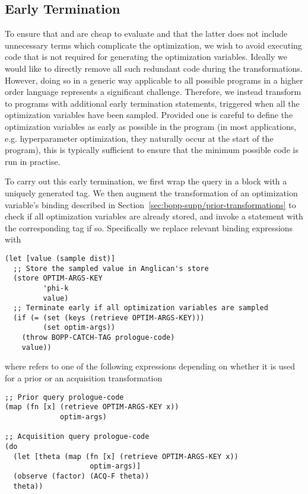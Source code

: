 \subsection{Early Termination}
\label{sec:bopp-supp/early-term}
To ensure that  and  are cheap to evaluate and that the latter does not include unnecessary terms which complicate the optimization, we wish to avoid executing code that is not required for generating the optimization variables.
Ideally we would like to directly remove all such redundant code during the transformations.
However, doing so in a generic way applicable to all possible programs in a higher order language represents a significant challenge.
Therefore, we instead transform to programs with additional early termination statements, triggered when all the optimization variables have been sampled.  
Provided one is careful to define the optimization variables as early as possible in the program (in most applications, e.g. hyperparameter optimization, they naturally occur at the start of the program), this is typically sufficient to ensure that the minimum possible code is run in practise.

To carry out this early termination, we first wrap the query in a  block with a uniquely generated tag.  We then augment the transformation of an optimization variable's binding described in Section~\ref{sec:bopp-supp/prior-transformations} to check if all optimization variables are already stored, and invoke a  statement with the corresponding tag if so.  Specifically we replace relevant binding expressions  with
    \begin{lstlisting}[basicstyle=\footnotesize\ttfamily]
(let [value (sample dist)]
  ;; Store the sampled value in Anglican's store
  (store OPTIM-ARGS-KEY
         'phi-k
         value)
  ;; Terminate early if all optimization variables are sampled
  (if (= (set (keys (retrieve OPTIM-ARGS-KEY)))
         (set optim-args))
    (throw BOPP-CATCH-TAG prologue-code)
    value))
    \end{lstlisting}
where  refers to one of the following expressions depending on whether it is used for a prior or an acquisition transformation
    \begin{lstlisting}[basicstyle=\footnotesize\ttfamily]
;; Prior query prologue-code
(map (fn [x] (retrieve OPTIM-ARGS-KEY x))
             optim-args)

;; Acquisition query prologue-code
(do
  (let [theta (map (fn [x] (retrieve OPTIM-ARGS-KEY x))
                    optim-args)]
  (observe (factor) (ACQ-F theta))
  theta))
    \end{lstlisting}

